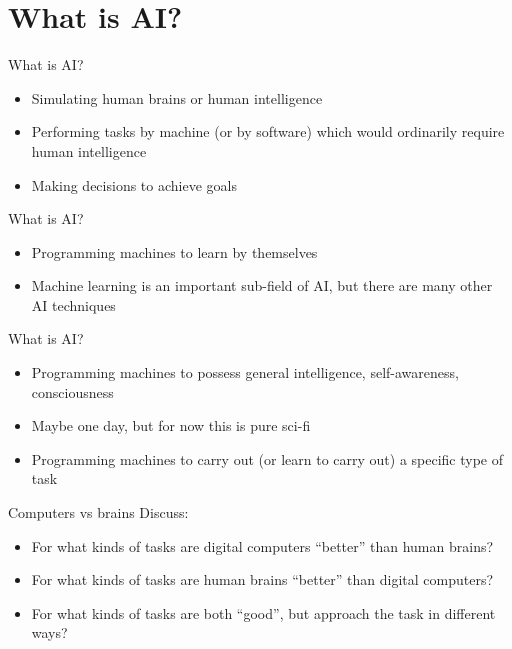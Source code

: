 \part{What is AI?}
\frame{\partpage}

\begin{frame}{What is AI?}
    \begin{itemize}
        \pause\item[\xmark] Simulating human brains or human intelligence
        \pause\item[\cmark] Performing tasks by machine (or by software) which would ordinarily require human intelligence
        \pause\item[\cmark] Making decisions to achieve goals
    \end{itemize}
\end{frame}

\begin{frame}{What is AI?}
    \begin{itemize}
        \pause\item[\xmark] Programming machines to learn by themselves
        \pause\item[\cmark] Machine learning is an important sub-field of AI, but there are many other AI techniques
    \end{itemize}
\end{frame}

\begin{frame}{What is AI?}
    \begin{itemize}
        \pause\item[\xmark] Programming machines to possess general intelligence, self-awareness, consciousness
        \pause\item[\cmark] Maybe one day, but for now this is pure sci-fi
        \pause\item[\cmark] Programming machines to carry out (or learn to carry out) a specific type of task
    \end{itemize}
\end{frame}

\begin{frame}{Computers vs brains}
	Discuss:
	\begin{itemize}
		\pause\item For what kinds of tasks are digital computers ``better'' than human brains?
		\pause\item For what kinds of tasks are human brains ``better'' than digital computers?
		\pause\item For what kinds of tasks are both ``good'', but approach the task in different ways?
	\end{itemize}
\end{frame}

